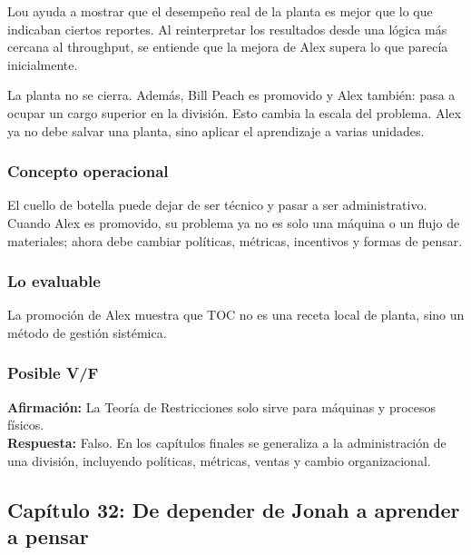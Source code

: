 \documentclass[
  11pt,
]{article}
\begin{document}
Lou ayuda a mostrar que el desempeño real de la planta es mejor que lo
que indicaban ciertos reportes. Al reinterpretar los resultados desde
una lógica más cercana al throughput, se entiende que la mejora de Alex
supera lo que parecía inicialmente.

La planta no se cierra. Además, Bill Peach es promovido y Alex también:
pasa a ocupar un cargo superior en la división. Esto cambia la escala
del problema. Alex ya no debe salvar una planta, sino aplicar el
aprendizaje a varias unidades.

\hypertarget{concepto-operacional-4}{%
\subsubsection{Concepto operacional}\label{concepto-operacional-4}}

El cuello de botella puede dejar de ser técnico y pasar a ser
administrativo. Cuando Alex es promovido, su problema ya no es solo una
máquina o un flujo de materiales; ahora debe cambiar políticas,
métricas, incentivos y formas de pensar.

\hypertarget{lo-evaluable-4}{%
\subsubsection{Lo evaluable}\label{lo-evaluable-4}}

La promoción de Alex muestra que TOC no es una receta local de planta,
sino un método de gestión sistémica.

\hypertarget{posible-vf-4}{%
\subsubsection{Posible V/F}\label{posible-vf-4}}

\textbf{Afirmación:} La Teoría de Restricciones solo sirve para máquinas
y procesos físicos.\\
\textbf{Respuesta:} Falso. En los capítulos finales se generaliza a la
administración de una división, incluyendo políticas, métricas, ventas y
cambio organizacional.

\hypertarget{capuxedtulo-32-de-depender-de-jonah-a-aprender-a-pensar}{%
\subsection{Capítulo 32: De depender de Jonah a aprender a
pensar}\label{capuxedtulo-32-de-depender-de-jonah-a-aprender-a-pensar}}
\end{document}
